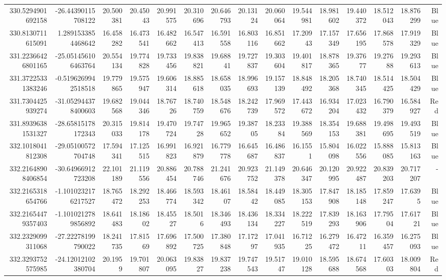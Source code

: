 \begin{center}
\begin{longtable}{rrrrrrrrrrrrrrr}
330.5294901692158 & -26.44390115708122 & 20.500381 & 20.45043 & 20.991575 & 20.310696 & 20.646793 & 20.13124 & 20.060064 & 19.544981 & 18.981602 & 19.440372 & 18.512043 & 18.876299 & Blue \\
330.8130711615091 & 1.2891533854468642 & 16.458282 & 16.473541 & 16.482662 & 16.547413 & 16.591558 & 16.803116 & 16.851662 & 17.20943 & 17.157349 & 17.656195 & 17.868578 & 17.919329 & Blue \\
331.22366426801165 & -25.051456106463764 & 20.554134 & 19.774828 & 19.733456 & 19.838821 & 19.68841 & 19.727837 & 19.303604 & 19.401817 & 18.878365 & 19.37677 & 19.27688 & 19.293613 & Blue \\
331.37225331383246 & -0.5196269942518518 & 19.779865 & 19.575947 & 19.606314 & 18.885618 & 18.658035 & 18.996693 & 19.157139 & 18.848492 & 18.205368 & 18.740345 & 18.514425 & 18.504429 & Blue \\
331.7304425939274 & -31.052944378400603 & 19.682568 & 19.044346 & 18.76726 & 18.740759 & 18.548676 & 18.242739 & 17.969572 & 17.443672 & 16.934204 & 17.023432 & 16.790379 & 16.584927 & Red \\
331.89396381531327 & -28.65815178172343 & 20.315033 & 19.814178 & 19.470724 & 19.74728 & 19.965652 & 19.38705 & 18.23384 & 19.388569 & 18.354153 & 19.688381 & 19.498695 & 19.493519 & Blue \\
332.1018041812308 & -29.05100572704748 & 17.594341 & 17.125515 & 16.991823 & 16.921879 & 16.779778 & 16.645687 & 16.486837 & 16.1551 & 15.804098 & 16.022556 & 15.888085 & 15.813163 & Blue \\
332.21648908406854 & -30.64966912723208 & 22.101189 & 21.119556 & 20.886454 & 20.788746 & 21.241676 & 20.923752 & 21.149378 & 20.646347 & 20.120995 & 20.922487 & 20.839203 & 20.717207 & - \\
332.2165318654766 & -1.1010232176217527 & 18.765472 & 18.292253 & 18.466774 & 18.593342 & 18.46107 & 18.58442 & 18.449085 & 18.305153 & 17.847908 & 18.185148 & 17.859247 & 17.6395 & Blue \\
332.21654479357403 & -1.1010212789856892 & 18.641483 & 18.18602 & 18.45527 & 18.5016 & 18.346493 & 18.436134 & 18.334227 & 18.222519 & 17.839293 & 18.163906 & 17.79504 & 17.61721 & Blue \\
332.2329099311068 & -27.22278199790022 & 18.241735 & 17.81569 & 17.696892 & 17.500725 & 17.380848 & 17.17297 & 17.041935 & 16.71225 & 16.279472 & 16.47211 & 16.359457 & 16.275093 & Blue \\
332.3293752575985 & -24.12012102380704 & 20.1959 & 19.701807 & 20.063095 & 19.83827 & 19.837238 & 19.747543 & 19.51747 & 19.010128 & 18.595688 & 18.674568 & 17.60303 & 18.009804 & Red \\

\end{longtable}
\end{center}
